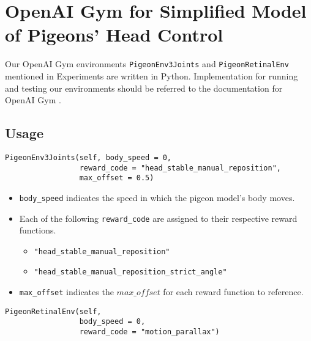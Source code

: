 \section{OpenAI Gym for Simplified Model of Pigeons' Head Control} \label{append:1}
Our OpenAI Gym \cite{brockman2016openai} environments \lstinline|PigeonEnv3Joints| and \lstinline|PigeonRetinalEnv| mentioned in Experiments are written in Python. Implementation for running and testing our environments should be referred to the documentation for OpenAI Gym \cite{openai_2016}.

\subsection{Usage}
\begin{lstlisting}
PigeonEnv3Joints(self, body_speed = 0,
                 reward_code = "head_stable_manual_reposition",
                 max_offset = 0.5)
\end{lstlisting}
\begin{itemize}
    \item \lstinline|body_speed| indicates the speed in which the pigeon model's body moves.

    \item Each of the following \lstinline|reward_code| are assigned to their respective reward functions.
        \begin{itemize}
          \item \lstinline|"head_stable_manual_reposition"|
          \item \lstinline|"head_stable_manual_reposition_strict_angle"|
        \end{itemize}
    \item \lstinline|max_offset| indicates the $max\_offset$ for each reward function to reference.
\end{itemize}

\begin{lstlisting}
PigeonRetinalEnv(self,
                 body_speed = 0,
                 reward_code = "motion_parallax")
\end{lstlisting}

